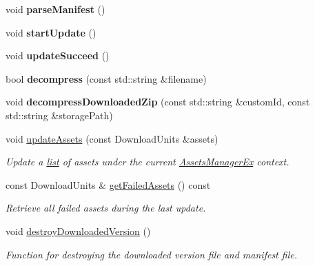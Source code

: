 \begin{DoxyCompactItemize}
void {\bfseries parse\+Manifest} ()
\item 
\mbox{\label{classAssetsManagerEx_a9e9ec71020d3f9f3efef411666eff6b4}} 
void {\bfseries start\+Update} ()
\item 
\mbox{\label{classAssetsManagerEx_a9e1a7f5f3e1b144810515967a396eab8}} 
void {\bfseries update\+Succeed} ()
\item 
\mbox{\label{classAssetsManagerEx_a7949bee801d7de84b7673f035cc81b91}} 
bool {\bfseries decompress} (const std\+::string \&filename)
\item 
\mbox{\label{classAssetsManagerEx_a85ab4d3b1f50b4c84272da0fa7ee7dae}} 
void {\bfseries decompress\+Downloaded\+Zip} (const std\+::string \&custom\+Id, const std\+::string \&storage\+Path)
\item 
\mbox{\label{classAssetsManagerEx_ac1ff9e745a237249951709f764e56c3b}} 
void \hyperlink{classAssetsManagerEx_ac1ff9e745a237249951709f764e56c3b}{update\+Assets} (const Download\+Units \&assets)
\begin{DoxyCompactList}\small\item\em Update a \hyperlink{protocollist-p}{list} of assets under the current \hyperlink{classAssetsManagerEx}{Assets\+Manager\+Ex} context. \end{DoxyCompactList}\item 
\mbox{\label{classAssetsManagerEx_ae94780fe36d61b10e7be14a849bd89b0}} 
const Download\+Units \& \hyperlink{classAssetsManagerEx_ae94780fe36d61b10e7be14a849bd89b0}{get\+Failed\+Assets} () const
\begin{DoxyCompactList}\small\item\em Retrieve all failed assets during the last update. \end{DoxyCompactList}\item 
\mbox{\label{classAssetsManagerEx_a3d03f738e7b48ab5183c5c9aa8b36282}} 
void \hyperlink{classAssetsManagerEx_a3d03f738e7b48ab5183c5c9aa8b36282}{destroy\+Downloaded\+Version} ()
\begin{DoxyCompactList}\small\item\em Function for destroying the downloaded version file and manifest file. \end{DoxyCompactList}\item 

\end{DoxyCompactItemize}
